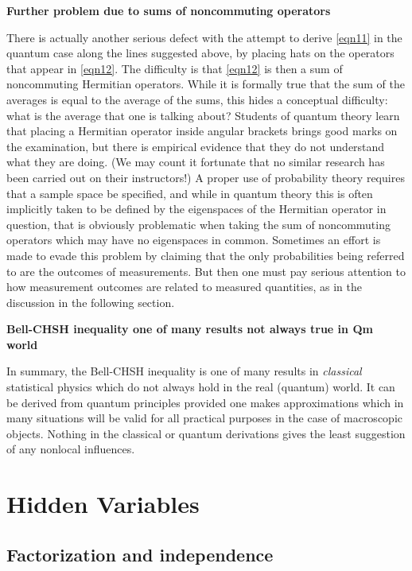 \documentclass[12pt]{article} %
\def\outl#1{\par{\medskip\noindent\hspace*{.5cm}\bf
      \mathversion{bold}#1\mathversion{normal}\smallskip} }
\def\np{} \def\xa{} \def\xb{} \def\xn{} \def\xp{}
\def\outl#1{} \def\np{} \def\xa{} \def\xb{} \def\xn{} \def\xp{}
\def\outl#1{\par{\medskip\noindent\hspace*{.5cm}\bf
      \mathversion{bold}#1\mathversion{normal}\smallskip} }
\def\np{\newpage }\def\xn{\nopagebreak }\def\xp{\pagebreak }
\begin{document}
\xb
\outl{Further problem due to sums of noncommuting operators}
\xa


There is actually another serious defect with the attempt to derive
\eqref{eqn11} in the quantum case along the lines suggested above, by placing
hats on the operators that appear in \eqref{eqn12}.  The difficulty is that
\eqref{eqn12} is then a sum of noncommuting Hermitian operators.  While it is
formally true that the sum of the averages is equal to the average of the
sums, this hides a conceptual difficulty: what is the average that one is
talking about?  Students of quantum theory learn that placing a Hermitian
operator inside angular brackets brings good marks on the examination, but
there is empirical evidence \cite{SnBC06} that they do not understand
what they are doing. (We may count it fortunate that no similar research has
been carried out on their instructors!)  A proper use of probability theory
requires that a sample space be specified, and while in quantum theory this is
often implicitly taken to be defined by the eigenspaces of the Hermitian
operator in question, that is obviously problematic when taking the sum of
noncommuting operators which may have no eigenspaces in common.  Sometimes an
effort is made to evade this problem by claiming that the only probabilities
being referred to are the outcomes of measurements. But then one must pay
serious attention to how measurement outcomes are related to measured
quantities, as in the discussion in the following section. 

\xb
\outl{Bell-CHSH inequality one of many results not always true in Qm world}
\xa

In summary, the Bell-CHSH inequality is one of many results in
\emph{classical} statistical physics which do not always hold in the real
(quantum) world.  It can be derived from quantum principles provided one makes
approximations which in many situations will be valid for all practical
purposes in the case of macroscopic objects.  Nothing in the classical or
quantum derivations gives the least suggestion of any nonlocal influences.

\xb
\section{Hidden Variables}
\label{sct5}
\xa

\xb
\subsection{Factorization and independence}
\label{sct5a}
\xa
\end{document}
